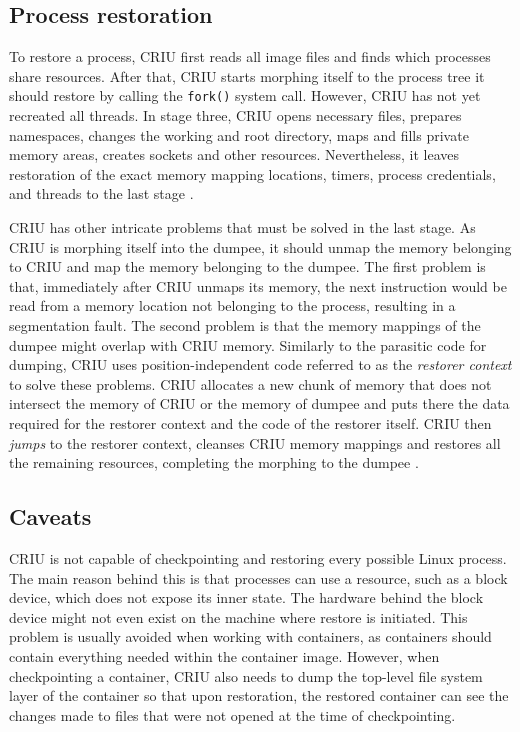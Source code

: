 \documentclass[
  digital,     %
  oneside,     %
  nosansbold,  %
  nocolorbold, %
  lof,         %
  nolot,         %
]{fithesis4}
\begin{document}
\subsection{Process restoration}
To restore a process, CRIU first reads all image files and finds which processes share resources. After that, CRIU starts morphing itself to the process tree it should restore by calling the \texttt{fork()} system call. However, CRIU has not yet recreated all threads. In stage three, CRIU opens necessary files, prepares namespaces, changes the working and root directory, maps and fills private memory areas, creates sockets and other resources. Nevertheless, it leaves restoration of the exact memory mapping locations, timers, process credentials, and threads to the last stage \cite{criu_cr}.

CRIU has other intricate problems that must be solved in the last stage. As CRIU is morphing itself into the dumpee, it should unmap the memory belonging to CRIU and map the memory belonging to the dumpee. The first problem is that, immediately after CRIU unmaps its memory, the next instruction would be read from a memory location not belonging to the process, resulting in a segmentation fault. The second problem is that the memory mappings of the dumpee might overlap with CRIU memory. Similarly to the parasitic code for dumping, CRIU uses position-independent code referred to as the \emph{restorer context} to solve these problems. CRIU allocates a new chunk of memory that does not intersect the memory of CRIU or the memory of dumpee and puts there the data required for the restorer context and the code of the restorer itself. CRIU then \emph{jumps} to the restorer context, cleanses CRIU memory mappings and restores all the remaining resources, completing the morphing to the dumpee \cite{criu_restorer}.


\subsection{Caveats}
\label{section:caveats}
CRIU is not capable of checkpointing and restoring every possible Linux process. The main reason behind this is that processes can use a resource, such as a block device, which does not expose its inner state. The hardware behind the block device might not even exist on the machine where restore is initiated. This problem is usually avoided when working with containers, as containers should contain everything needed within the container image. However, when checkpointing a container, CRIU also needs to dump the top-level file system layer of the container so that upon restoration, the restored container can see the changes made to files that were not opened at the time of checkpointing.
\end{document}
